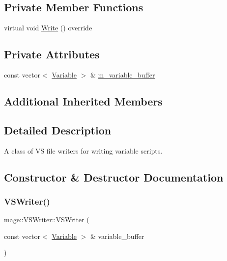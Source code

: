\subsection*{Private Member Functions}
\begin{DoxyCompactItemize}
\item 
virtual void \hyperlink{classmage_1_1_v_s_writer_a417c8bcf7ab26e88b253e9ffbdb60192}{Write} () override
\end{DoxyCompactItemize}
\subsection*{Private Attributes}
\begin{DoxyCompactItemize}
\item 
const vector$<$ \hyperlink{structmage_1_1_variable}{Variable} $>$ \& \hyperlink{classmage_1_1_v_s_writer_a4f36e6a94d4fd8d3038f189a76582abe}{m\+\_\+variable\+\_\+buffer}
\end{DoxyCompactItemize}
\subsection*{Additional Inherited Members}


\subsection{Detailed Description}
A class of VS file writers for writing variable scripts. 

\subsection{Constructor \& Destructor Documentation}
\hypertarget{classmage_1_1_v_s_writer_ac1a9ff905a94e9c89a7ed48dc7c4b629}{}\label{classmage_1_1_v_s_writer_ac1a9ff905a94e9c89a7ed48dc7c4b629} 
\subsubsection{\texorpdfstring{V\+S\+Writer()}{VSWriter()}\hspace{0.1cm}{\footnotesize\ttfamily [1/3]}}
{\footnotesize\ttfamily mage\+::\+V\+S\+Writer\+::\+V\+S\+Writer (\begin{DoxyParamCaption}\item[{const vector$<$ \hyperlink{structmage_1_1_variable}{Variable} $>$ \&}]{variable\+\_\+buffer }\end{DoxyParamCaption})\hspace{0.3cm}{\ttfamily [explicit]}}

